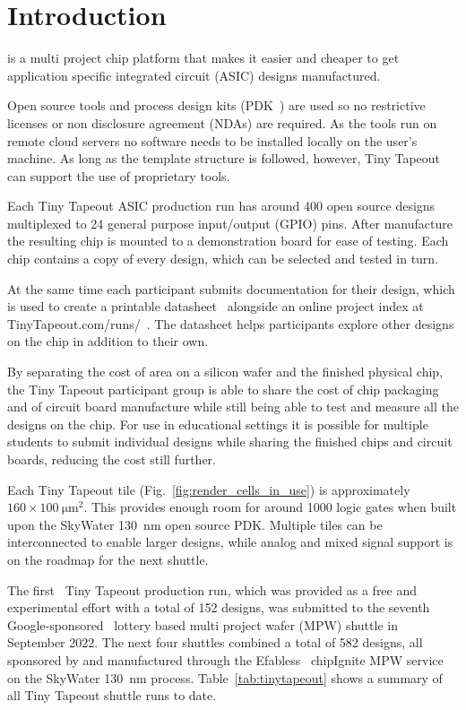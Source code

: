\section{Introduction}
\label{sec:introduction}
 is a multi project chip platform that makes it easier and cheaper to get application specific integrated circuit (ASIC) designs manufactured.

Open source tools and process design kits (PDK~\cite{pdk}) are used so no restrictive licenses or non disclosure agreement (NDAs) are required. As the tools run on remote cloud servers no software needs to be installed locally on the user's machine. As long as the template structure is followed, however, Tiny Tapeout can support the use of proprietary tools.

Each Tiny Tapeout ASIC production run has around 400 open source designs multiplexed to 24 general purpose input/output (GPIO) pins. After manufacture the resulting chip is mounted to a demonstration board for ease of testing. Each chip contains a copy of every design, which can be selected and tested in turn.

At the same time each participant submits documentation for their design, which is used to create a printable datasheet~\cite{datasheet} alongside an online project index at TinyTapeout.com/runs/~\cite{tinytapeoutruns}. The datasheet helps participants explore other designs on the chip in addition to their own.

By separating the cost of area on a silicon wafer and the finished physical chip, the Tiny Tapeout participant group is able to share the cost of chip packaging and of circuit board manufacture while still being able to test and measure all the designs on the chip. For use in educational settings it is possible for multiple students to submit individual designs while sharing the finished chips and circuit boards, reducing the cost still further.

Each Tiny Tapeout tile (Fig.~\ref{fig:render_cells_in_use}) is approximately $160 \times \qty{100}{\micro\meter\squared}$. This provides enough room for around 1000 logic gates when built upon the SkyWater \qty{130}{\nm} open source PDK. Multiple tiles can be interconnected to enable larger designs, while analog and mixed signal support is on the roadmap for the next shuttle.

The first~\cite{firstshuttle} Tiny Tapeout production run, which was provided as a free and experimental effort with a total of 152 designs, was submitted to the seventh Google-sponsored~\cite{googlesponsored} lottery based multi project wafer (MPW) shuttle in September 2022.
The next four shuttles combined a total of 582 designs, all sponsored by and manufactured through the Efabless~\cite{efabless} chipIgnite MPW service on the SkyWater \qty{130}{\nm} process. Table~\ref{tab:tinytapeout} shows a summary of all Tiny Tapeout shuttle runs to date.

